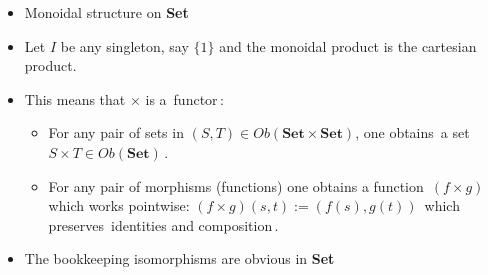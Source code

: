 
\begin{itemize}
    \item Monoidal structure on \textbf{Set}
    \item Let $I$ be any singleton, say $\{1\}$ and the monoidal product is the cartesian product.
    \item This means that $\times$ is a \,functor\,:
          \begin{itemize}
            \item For any pair of sets in $(S,T) \in Ob(\mathbf{Set}\times\mathbf{Set})$, one obtains \,a set $S \times T \in Ob(\mathbf{Set})$\,.
            \item For any pair of morphisms (functions) one obtains a function \,$(f\times g)$ which works pointwise: $(f\times g)(s,t):=(f(s),g(t))$\, which preserves \,identities and composition\,.
          \end{itemize}
    \item The bookkeeping isomorphisms are obvious in \textbf{Set}

  \end{itemize}
